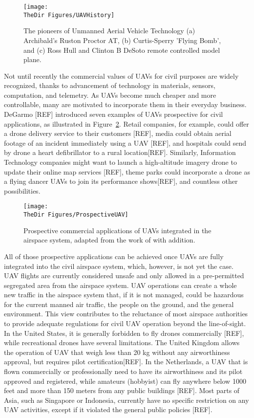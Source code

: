\begin{figure}
\texttt{[image: \\TheDir Figures/UAVHistory]}
 \caption{The pioneers of Unmanned Aerial Vehicle Technology (a) Archibald's Ruston Proctor AT, (b) Curtis-Sperry 'Flying Bomb', and (c) Ross Hull and Clinton B DeSoto remote controlled model plane.} 
\label{f:UAVHistory}
\end{figure}

Not until recently the commercial values of UAVs for civil purposes are widely recognized, thanks to advancement of technology in materials, sensors, computation, and telemetry. As UAVs become much cheaper and more controllable, many are motivated to incorporate them in their everyday business. DeGarmo [REF] introduced seven examples of UAVs prospective for civil applications, as illustrated in Figure~\ref{f:ProspectiveUAV}. Retail companies, for example, could offer a drone delivery service to their customers [REF], media could obtain aerial footage of an incident immediately using a UAV [REF], and hospitals could send by drone a heart defibrillator to a rural location[REF]. Similarly, Information Technology companies might want to launch a high-altitude imagery drone to update their online map services [REF], theme parks could incorporate a drone as a flying dancer UAVs to join its performance shows[REF], and countless other possibilities. 

\begin{figure}
\begin{center}
\texttt{[image: \\TheDir Figures/ProspectiveUAV]}
\end{center}
\caption{Prospective commercial applications of UAVs integrated in the airspace system, adapted from the work of \cite{degarmo:04} with addition.} %
\label{f:ProspectiveUAV}
\end{figure}

All of those prospective applications can be achieved once UAVs are fully integrated into the civil airspace system, which, however, is not yet the case. UAV flights are currently considered unsafe and only allowed in a pre-permitted segregated area from the airspace system. UAV operations can create a whole new traffic in the airspace system that, if it is not managed, could be hazardous for the current manned air traffic, the people on the ground, and the general environment. This view contributes to the reluctance of most airspace authorities to provide adequate regulations for civil UAV operation beyond the line-of-sight\cite{CAP722}. In the United States, it is generally forbidden to fly drones commercially [REF], while recreational drones have several limitations. The United Kingdom allows the operation of UAV that weigh less than 20 kg without any airworthiness approval, but requires pilot certification[REF]. In the Netherlands, a UAV that is flown commercially or professionally need to have its airworthiness and its pilot approved and registered, while amateurs (hobbyist) can fly anywhere below 1000 feet and more than 150 meters from any public buildings [REF]. Most parts of Asia, such as Singapore or Indonesia, currently have no specific restriction on any UAV activities, except if it violated the general public policies [REF].

